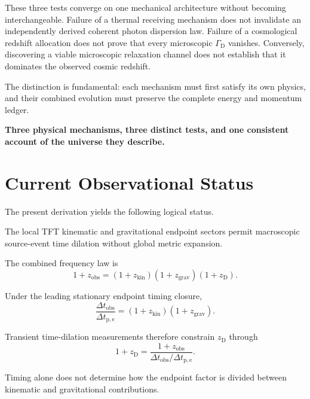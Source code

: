 \medskip

These three tests converge on one mechanical
architecture without becoming interchangeable.
Failure of a thermal receiving mechanism does not
invalidate an independently derived coherent photon
dispersion law. Failure of a cosmological redshift
allocation does not prove that every microscopic
$\Gamma_{\mathrm D}$ vanishes. Conversely, discovering
a viable microscopic relaxation channel does not
establish that it dominates the observed cosmic redshift.

The distinction is fundamental: each mechanism must
first satisfy its own physics, and their combined
evolution must preserve the complete energy and
momentum ledger.

\medskip
\noindent\textbf{Three physical mechanisms, three
distinct tests, and one consistent account of
the universe they describe.}

\section{Current Observational Status}

The present derivation yields the following logical status.

The local TFT kinematic and gravitational endpoint sectors permit macroscopic
source-event time dilation without global metric expansion.

The combined frequency law is
\begin{equation}
    \boxed{
    1+z_{\mathrm{obs}}
    =
    (1+z_{\mathrm{kin}})
    (1+z_{\mathrm{grav}})
    (1+z_{\mathrm D}).
    }
\end{equation}

Under the leading stationary endpoint timing closure,
\begin{equation}
    \frac{
        \Delta t_{\mathrm{obs}}
    }{
        \Delta t_{\mathrm{p,e}}
    }
    =
    (1+z_{\mathrm{kin}})
    (1+z_{\mathrm{grav}}).
\end{equation}

Transient time-dilation measurements therefore constrain \(z_{\mathrm D}\)
through
\begin{equation}
    \boxed{
    1+z_{\mathrm D}
    =
    \frac{
        1+z_{\mathrm{obs}}
    }{
        \Delta t_{\mathrm{obs}}/\Delta t_{\mathrm{p,e}}
    }.
    }
\end{equation}

Timing alone does not determine how the endpoint factor is divided between
kinematic and gravitational contributions.

